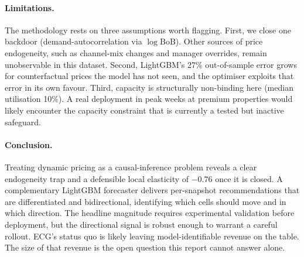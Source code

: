 \documentclass[11pt,a4paper]{article}
\begin{document}
\paragraph{Limitations.} The methodology rests on three assumptions worth flagging. First, we close one backdoor (demand-autocorrelation via $\log\mathrm{BoB}$). Other sources of price endogeneity, such as channel-mix changes and manager overrides, remain unobservable in this dataset. Second, LightGBM's 27\% out-of-sample error grows for counterfactual prices the model has not seen, and the optimiser exploits that error in its own favour. Third, capacity is structurally non-binding here (median utilisation 10\%). A real deployment in peak weeks at premium properties would likely encounter the capacity constraint that is currently a tested but inactive safeguard.

\paragraph{Conclusion.} Treating dynamic pricing as a causal-inference problem reveals a clear endogeneity trap and a defensible local elasticity of $-0.76$ once it is closed. A complementary LightGBM forecaster delivers per-snapshot recommendations that are differentiated and bidirectional, identifying which cells should move and in which direction. The headline magnitude requires experimental validation before deployment, but the directional signal is robust enough to warrant a careful rollout. ECG's status quo is likely leaving model-identifiable revenue on the table. The size of that revenue is the open question this report cannot answer alone.
\end{document}
